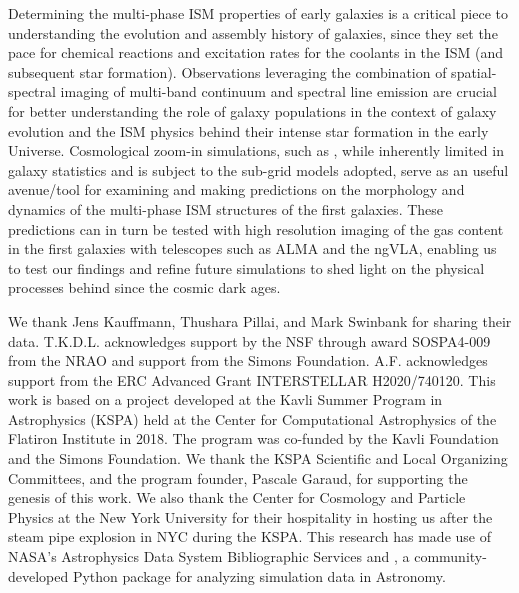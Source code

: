 \IfFileExists{emulateapjlegacy.cls}{\documentclass[iop]{emulateapjlegacy}}{\documentclass[iop]{emulateapj}}
\begin{document}
Determining the multi-phase ISM properties of early galaxies
is a critical piece to understanding the evolution and
assembly history of galaxies, since they set the pace
for chemical reactions and excitation rates for the coolants in the ISM (and subsequent star formation).
Observations leveraging the combination of spatial-spectral imaging of
multi-band continuum and spectral line emission are crucial for better understanding
the role of \highz galaxy populations
in the context of galaxy evolution and the ISM physics behind their intense star formation in the early Universe.
Cosmological zoom-in simulations, such as , while inherently limited in galaxy
statistics and is subject to the sub-grid models adopted, 
serve as an useful avenue/tool for examining and making predictions on the morphology and dynamics of
the multi-phase ISM structures of the first galaxies.
These predictions can in turn be
tested with high resolution imaging of the gas content in the first galaxies with telescopes such as ALMA and the ngVLA,
enabling us to test our findings and refine future simulations to shed light on the physical processes behind 
\SF since the cosmic dark ages.


\acknowledgements

We thank Jens Kauffmann, Thushara Pillai, and Mark Swinbank for sharing their data.
T.K.D.L. acknowledges support by the NSF through award SOSPA4-009
from the NRAO and support from the Simons Foundation.
A.F. acknowledges support from the ERC Advanced Grant INTERSTELLAR H2020/740120.
This work is based on a project developed at the Kavli Summer Program in Astrophysics (KSPA)
held at the Center for
Computational Astrophysics of the Flatiron Institute in 2018. The program was co-funded by the Kavli
Foundation and the Simons Foundation.
We thank the KSPA Scientific and Local Organizing Committees, and the program founder,
Pascale Garaud, for supporting the genesis of this work.
We also thank the Center for Cosmology and Particle Physics
at the New York University
for their hospitality in hosting us after the steam pipe explosion in NYC during the KSPA.
This research has made use of NASA's Astrophysics Data System Bibliographic Services
and , a community-developed Python package for analyzing simulation data in Astronomy.
\end{document}

